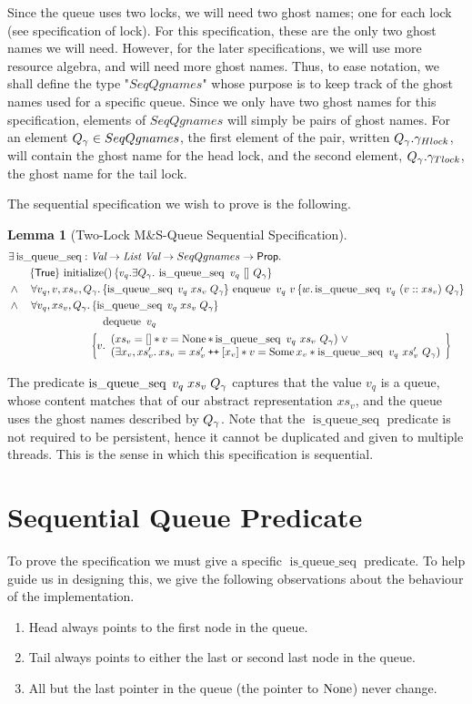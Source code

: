 \documentclass[a4paper, 11pt]{report}
\newtheorem{lemma}[theorem]{Lemma}
\newcommand{\initialise}{\operatorname{initialize}}
\newcommand{\enqueue}{\operatorname{enqueue}}
\newcommand{\dequeue}{\operatorname{dequeue}}
\newcommand{\tlmsq}{Two-Lock M\&S-Queue\xspace}
\newcommand{\isqueueseq}{\operatorname{is\_queue\_seq}}
\newcommand{\SeqQgnames}{SeqQgnames}
\newcommand\catenate{\mathbin{\text{\ttfamily\upshape ++}}}
\newcommand{\tlseqspecinit}{\hoare{\TRUE}{\initialise \TT}{v_q . \Exists Q_\gname. \isqueueseq\ v_q\ []\ Q_\gname}}
\newcommand{\tlseqspecenq}{\All v_q, v, xs_v, Q_\gname. \hoare{\isqueueseq \; v_q \; xs_v \; Q_\gname}{\enqueue\ v_q\ v}{w . \isqueueseq\ v_q\ (v :: xs_v)\ Q_\gname}}
\newcommand{\tlseqspecdeq}{\All v_q, xs_v, Q_\gname. \hoareV[t]{\isqueueseq \; v_q \; xs_v \; Q_\gname}{\dequeue\ v_q}{v . \begin{array}{l}(xs_v = [] \star v = \None \star \isqueueseq\ v_q\ xs_v\ Q_\gname) \; \lor\\ (\Exists x_v, xs_v' . xs_v = xs_v' \catenate [x_v] \star v = \Some x_v \star \isqueueseq\ v_q\ xs_v'\ Q_\gname) \end{array}}}
\begin{document}
Since the queue uses two locks, we will need two ghost names; one for each lock (see specification of lock). For this specification, these are the only two ghost names we will need. However, for the later specifications, we will use more resource algebra, and will need more ghost names. Thus, to ease notation, we shall define the type "$\SeqQgnames$" whose purpose is to keep track of the ghost names used for a specific queue. Since we only have two ghost names for this specification, elements of $\SeqQgnames$ will simply be pairs of ghost names. For an element $Q_\gname \in \SeqQgnames$, the first element of the pair, written $Q_\gamma.\gamma_{Hlock}$, will contain the ghost name for the head lock, and the second element, $Q_\gamma.\gamma_{Tlock}$, the ghost name for the tail lock.

The sequential specification we wish to prove is the following.
\begin{lemma}[\tlmsq Sequential Specification]\label{TLMSQ:spec:seq}
\begin{align*}
  &\Exists \isqueueseq : \Val \to \List \ \Val \to \SeqQgnames \to \Prop.\\
  &\quad\quad\tlseqspecinit\\
  &\land\quad\tlseqspecenq\\
  &\land\quad\tlseqspecdeq
\end{align*}
\end{lemma}

The predicate $\isqueueseq \; v_q \; xs_v \; Q_\gname$ captures that the value $v_q$ is a queue, whose content matches that of our abstract representation $xs_v$, and the queue uses the ghost names described by $Q_\gamma$. Note that the $\isqueueseq$ predicate is not required to be persistent, hence it cannot be duplicated and given to multiple threads. This is the sense in which this specification is sequential.

\section{Sequential Queue Predicate}
\label{TLMSQSEQ:section:seq-queue-pred}

To prove the specification we must give a specific $\isqueueseq$ predicate. To help guide us in designing this, we give the following observations about the behaviour of the implementation.
\begin{enumerate}
  \item\label{TLMSQ:insights:head} Head always points to the first node in the queue.
  \item\label{TLMSQ:insights:tail} Tail always points to either the last or second last node in the queue.
  \item\label{TLMSQ:insights:persistent} All but the last pointer in the queue (the pointer to $\operatorname{None}$) never change.
\end{enumerate}
\end{document}
